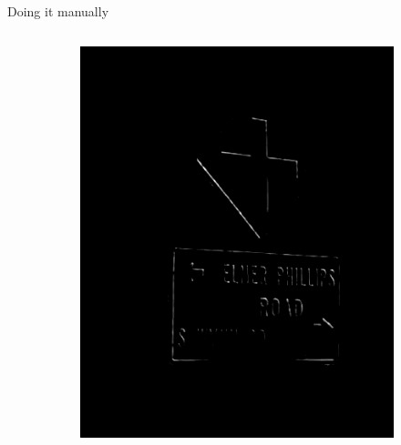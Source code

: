 \documentclass{beamer}
\begin{document}
\begin{frame}{Doing it manually}
\begin{columns}
\begin{column}{0.85\textwidth}
\begin{figure}
      \begin{subfigure}[b]{0.22\textwidth}
          \includegraphics[width=\textwidth]{figures/manual_filters/edge_res_1.png}
      \end{subfigure}
      \begin{subfigure}[b]{0.22\textwidth}

\end{subfigure}
\end{figure}
\end{column}
\end{columns}
\end{frame}
\end{document}
